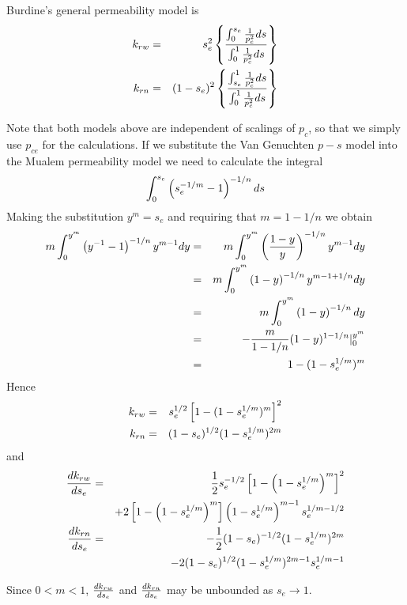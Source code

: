 \documentclass[10pt,dvips,twoside,reqno]{amsart}
\begin{document}
 Burdine's general permeability model is
\citep{Burdine_53}
\begin{eqnarray}
k_{rw} &=& s_e^2 \left\{ \frac{\int_0^{s_e} \frac{1}{p_c^2} ds }{\int_0^1 \frac{1}{p_c^2} ds } \right\}\\
k_{rn} &=& (1 - s_e)^2 \left\{ \frac{\int_{s_e}^1 \frac{1}{p_c^2} ds }{ \int_0^1 \frac{1}{p_c^2} ds}  \right\}
\end{eqnarray}

 Note that both models above are
independent of scalings of $p_c$, so that we simply use $p_{ce}$
for the calculations. If we substitute the Van Genuchten $p-s$ model
into the Mualem permeability model we need to calculate the integral
\begin{equation}
\int_0^{s_e}  \left( s_e^{-1/m} - 1 \right)^{-1/n}ds
\end{equation}
Making the substitution $y^m=s_e$ and requiring that $m=1 - 1/n$
we obtain \citep{VanGenuchten_80}
\begin{eqnarray}
m \int_0^{y^m}  \left( y^{-1} - 1 \right)^{-1/n} y^{m-1} dy &=& m \int_0^{y^m}  \left( \frac{1-y}{y}\right)^{-1/n} y^{m-1} dy \\
&=& m \int_0^{y^m}  \left( 1-y \right)^{-1/n} y^{m-1+1/n} dy \\
&=& m \int_0^{y^m}  \left( 1-y \right)^{-1/n}  dy \\
&=& -\frac{m}{1-1/n}(1-y)^{1-1/n} |_0^{y^m} \\
&=& 1 - (1 - s_e^{1/m})^m
\end{eqnarray}
Hence
\begin{eqnarray}
k_{rw} &=& s_e^{1/2} \left[ 1-(1-s_e^{1/m})^m \right]^2 \\
k_{rn} &=& (1-s_e)^{1/2}(1-s_e^{1/m})^{2m}
\end{eqnarray}
and
\begin{eqnarray}
\frac{d {k_{rw}}}{d {s_e}} &=& \frac{1}{2}s_e^{-1/2}\left[ 1 - \left( 1 - s_e^{1/m}\right)^m \right]^2 \\
&&+2 \left[ 1- \left( 1- s_e^{1/m}\right)^m \right] \left( 1-s_e^{1/m} \right)^{m-1} s_e^{1/m-1/2} \\
\frac{d {k_{rn}}}{d {s_e}} &=& -\frac{1}{2}(1-s_e)^{-1/2} (1-s_e^{1/m})^{2m} \\
&&-2(1-s_e)^{1/2}(1-s_e^{1/m})^{2m-1} s_e^{1/m-1}
\end{eqnarray}

Since $0 < m< 1$, $\frac{d {k_{rw}}}{d {s_e}}$ and $\frac{d {k_{rn}}}{d {s_e}}$
may be unbounded as $s_e \rightarrow 1$.
\end{document}
